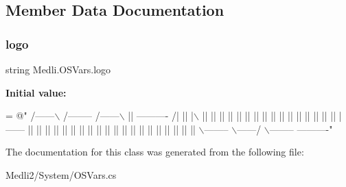 \subsection{Member Data Documentation}
\mbox{\label{class_medli_1_1_o_s_vars_a22247d9d5f8fc428be2016f17203db4e}} 
\subsubsection{\texorpdfstring{logo}{logo}}
{\footnotesize\ttfamily string Medli.\+O\+S\+Vars.\+logo\hspace{0.3cm}{\ttfamily [static]}}

{\bfseries Initial value\+:}
\begin{DoxyCode}
= \textcolor{stringliteral}{@"}
\textcolor{stringliteral}{ /------\(\backslash\)   /-------- /------\(\backslash\)  ||        ---------- }
\textcolor{stringliteral}{/|  ||  |\(\backslash\)  ||        ||    ||  ||            ||     }
\textcolor{stringliteral}{||  ||  ||  ||        ||    ||  ||            ||     }
\textcolor{stringliteral}{||  ||  ||  |------   ||    ||  ||            ||     }
\textcolor{stringliteral}{||      ||  ||        ||    ||  ||            ||     }
\textcolor{stringliteral}{||      ||  ||        ||    ||  ||            ||     }
\textcolor{stringliteral}{||      ||  \(\backslash\)-------- \(\backslash\)------/  \(\backslash\)-------- ----------"}
\end{DoxyCode}


The documentation for this class was generated from the following file\+:\begin{DoxyCompactItemize}
\item 
Medli2/\+System/O\+S\+Vars.\+cs\end{DoxyCompactItemize}
